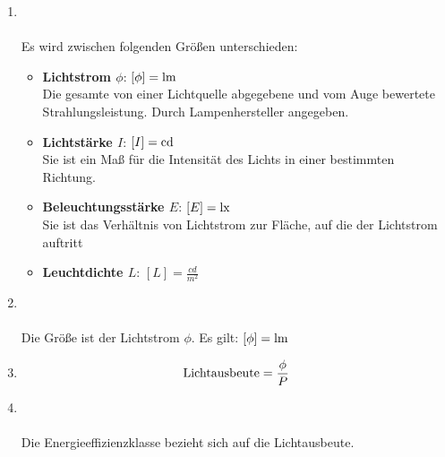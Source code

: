 \begin{enumerate}
    \item   {} \\\\
            
            Es wird zwischen folgenden Größen unterschieden:
            \begin{itemize}
                \item \textbf{Lichtstrom $\phi$}: $\left[\phi\right] = \textnormal{lm}$ \\ Die gesamte von einer Lichtquelle abgegebene und vom Auge bewertete Strahlungsleistung. Durch Lampenhersteller angegeben.
                \item \textbf{Lichtstärke $I$}: $\left[I\right] = \textnormal{cd}$ \\ Sie ist ein Maß für die Intensität des Lichts in einer bestimmten Richtung.
                \item \textbf{Beleuchtungsstärke $E$}: $\left[E\right] = \textnormal{lx}$ \\ Sie ist das Verhältnis von Lichtstrom zur Fläche, auf die der Lichtstrom auftritt
                \item \textbf{Leuchtdichte $L$}: $\left[L\right] = \frac{cd}{m^2}$
            \end{itemize}

    \item   {} \\\\
            Die Größe ist der Lichtstrom $\phi$. Es gilt: $\left[\phi\right] = \textnormal{lm}$

    \item   {}
            $$\textnormal{Lichtausbeute} = \frac{\phi}{P}$$

    \item   {} \\\\
            Die Energieeffizienzklasse bezieht sich auf die Lichtausbeute.


\end{enumerate}
